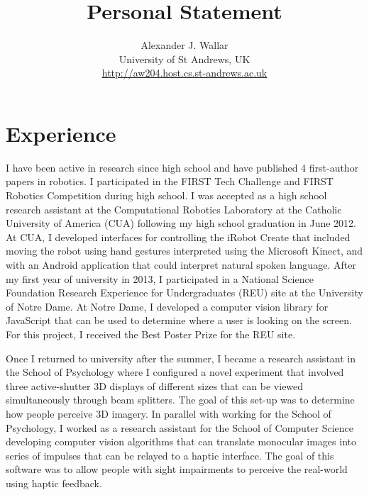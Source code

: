 \documentclass{article}
\begin{document}
\setlength{\parskip}{4pt} %

\title{Personal Statement}

\author{Alexander J. Wallar \\ University of St Andrews, UK
\\ \url{http://aw204.host.cs.st-andrews.ac.uk}}

\maketitle

\section{Experience}

I have been active in research since high school and have published 4
first-author papers in robotics. I participated in the FIRST Tech Challenge and
FIRST Robotics Competition during high school. I was accepted as a high school
research assistant at the Computational Robotics Laboratory at the Catholic
University of America (CUA) following my high school graduation in June 2012.
At CUA, I developed interfaces for controlling the iRobot Create that included
moving the robot using hand gestures interpreted using the Microsoft Kinect,
and with an Android application that could interpret natural spoken language.
After my first year of university in 2013, I participated in a National Science
Foundation Research Experience for Undergraduates (REU) site at the University
of Notre Dame. At Notre Dame, I developed a computer vision library for
JavaScript that can be used to determine where a user is looking on the screen.
For this project, I received the Best Poster Prize for the REU site.

Once I returned to university after the summer, I became a research assistant
in the School of Psychology where I configured a novel experiment that involved
three active-shutter 3D displays of different sizes that can be viewed
simultaneously through beam splitters. The goal of this set-up was to determine
how people perceive 3D imagery. In parallel with working for the School of
Psychology, I worked as a research assistant for the School of Computer Science
developing computer vision algorithms that can translate monocular images into
series of impulses that can be relayed to a haptic interface. The goal of this
software was to allow people with sight impairments to perceive the real-world
using haptic feedback.
\end{document}
